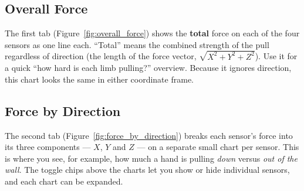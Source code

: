 \documentclass[11pt,a4paper]{article}
\begin{document}
\subsection{Overall Force}
The first tab (Figure~\ref{fig:overall_force}) shows the \textbf{total} force on
each of the four sensors as one line each. ``Total'' means the combined strength of
the pull regardless of direction (the length of the force vector,
$\sqrt{X^2+Y^2+Z^2}$). Use it for a quick ``how hard is each limb pulling?''
overview. Because it ignores direction, this chart looks the same in either
coordinate frame.

\subsection{Force by Direction}
The second tab (Figure~\ref{fig:force_by_direction}) breaks each sensor's force
into its three components --- $X$, $Y$ and $Z$ --- on a separate small chart per
sensor. This is where you see, for example, how much a hand is pulling
\emph{down} versus \emph{out of the wall}. The toggle chips above the charts let
you show or hide individual sensors, and each chart can be expanded.



\end{document}
